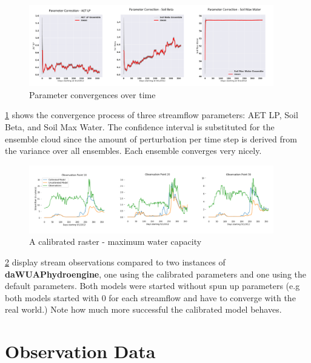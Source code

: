 \begin{figure}[h]
    \centering
    \includegraphics[width=0.95\textwidth]{param}
    \caption{Parameter convergences over time}
    \label{fig:param}
\end{figure} 

\ref{fig:param} shows the convergence process of three streamflow parameters: AET LP, Soil Beta, and Soil Max Water. The confidence interval is substituted for the ensemble cloud since the amount of perturbation per time step is derived from the variance over all ensembles. Each ensemble converges very nicely.

\begin{figure}[h]
    \centering
    \includegraphics[width=0.95\textwidth]{cali}
    \caption{A calibrated raster - maximum water capacity}
    \label{fig:cali}
\end{figure} 

\ref{fig:cali} display stream observations compared to two instances of \textbf{daWUAPhydroengine}, one using the calibrated parameters and one using the default parameters. Both models were started without spun up parameters (e.g both models started with 0 for each streamflow and have to converge with the real world.) Note how much more successful the calibrated model behaves.


\section{Observation Data}

